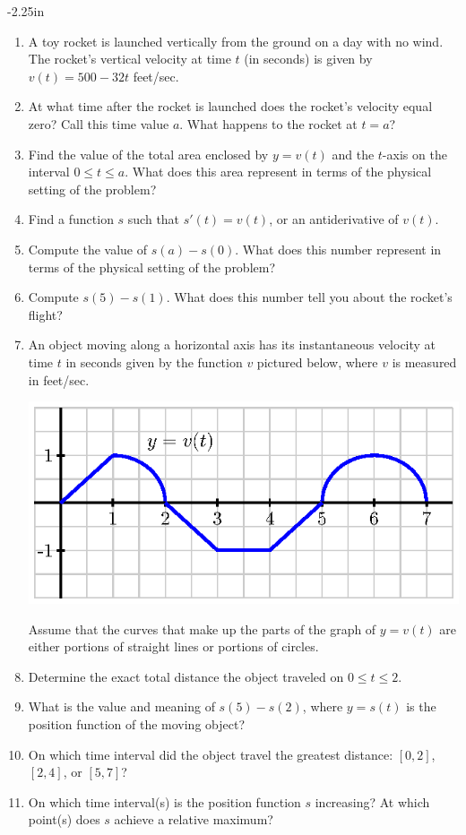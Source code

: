 \begin{adjustwidth*}{}{-2.25in}
\begin{multicols*}{2}
\begin{enumerate}[1)]
\item A toy rocket is launched vertically from the ground on a day with no wind.  The rocket's vertical velocity at time $t$ (in seconds) is given by $v(t)= 500-32t$ feet/sec.
  \ba
  	\item At what time after the rocket is launched does the rocket's velocity equal zero?  Call this time value $a$.  What happens to the rocket at $t = a$?
	\item Find the value of the total area enclosed by $y = v(t)$ and the $t$-axis on the interval $0 \le t \le a$.  What does this area represent in terms of the physical setting of the problem?
	\item Find a function $s$ such that $s'(t) = v(t)$, or an antiderivative of $v(t)$.
	\item Compute the value of $s(a) - s(0)$.  What does this number represent in terms of the physical setting of the problem?
	\item Compute $s(5) - s(1)$.  What does this number tell you about the rocket's flight?
  \ea
  
  \item An object moving along a horizontal axis has its instantaneous velocity at time $t$ in seconds given by the function $v$ pictured below, where $v$ is measured in feet/sec.
\begin{center}
\includegraphics[scale=.75]{figures/4_1_Ez3.eps}
\end{center}
Assume that the curves that make up the parts of the graph of $y=v(t)$ are either portions of straight lines or portions of circles.
 \ba
 	\item Determine the exact total distance the object traveled on $0 \le t \le 2$.
	\item What is the value and meaning of $s(5) - s(2)$, where $y = s(t)$ is the position function of the moving object?
	\item On which time interval did the object travel the greatest distance: $[0,2]$, $[2,4]$, or $[5,7]$?
	\item On which time interval(s) is the position function $s$ increasing?  At which point(s) does $s$ achieve a relative maximum?
 \ea
 

\end{enumerate}
\end{multicols*}
\end{adjustwidth*}
